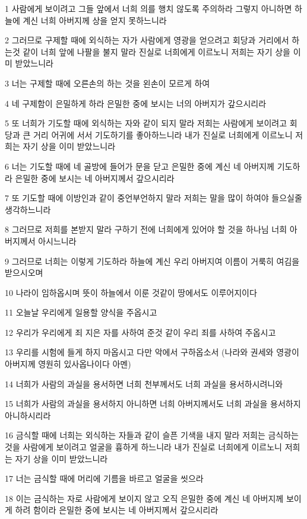 \par 1 사람에게 보이려고 그들 앞에서 너희 의를 행치 않도록 주의하라 그렇지 아니하면 하늘에 계신 너희 아버지께 상을 얻지 못하느니라
\par 2 그러므로 구제할 때에 외식하는 자가 사람에게 영광을 얻으려고 회당과 거리에서 하는것 같이 너희 앞에 나팔을 불지 말라 진실로 너희에게 이르노니 저희는 자기 상을 이미 받았느니라
\par 3 너는 구제할 때에 오른손의 하는 것을 왼손이 모르게 하여
\par 4 네 구제함이 은밀하게 하라 은밀한 중에 보시는 너의 아버지가 갚으시리라
\par 5 또 너희가 기도할 때에 외식하는 자와 같이 되지 말라 저희는 사람에게 보이려고 회당과 큰 거리 어귀에 서서 기도하기를 좋아하느니라 내가 진실로 너희에게 이르노니 저희는 자기 상을 이미 받았느니라
\par 6 너는 기도할 때에 네 골방에 들어가 문을 닫고 은밀한 중에 계신 네 아버지께 기도하라 은밀한 중에 보시는 네 아버지께서 갚으시리라
\par 7 또 기도할 때에 이방인과 같이 중언부언하지 말라 저희는 말을 많이 하여야 들으실줄 생각하느니라
\par 8 그러므로 저희를 본받지 말라 구하기 전에 너희에게 있어야 할 것을 하나님 너희 아버지께서 아시느니라
\par 9 그러므로 너희는 이렇게 기도하라 하늘에 계신 우리 아버지여 이름이 거룩히 여김을 받으시오며
\par 10 나라이 임하옵시며 뜻이 하늘에서 이룬 것같이 땅에서도 이루어지이다
\par 11 오늘날 우리에게 일용할 양식을 주옵시고
\par 12 우리가 우리에게 죄 지은 자를 사하여 준것 같이 우리 죄를 사하여 주옵시고
\par 13 우리를 시험에 들게 하지 마옵시고 다만 악에서 구하옵소서 (나라와 권세와 영광이 아버지께 영원히 있사옵나이다 아멘)
\par 14 너희가 사람의 과실을 용서하면 너희 천부께서도 너희 과실을 용서하시려니와
\par 15 너희가 사람의 과실을 용서하지 아니하면 너희 아버지께서도 너희 과실을 용서하지 아니하시리라
\par 16 금식할 때에 너희는 외식하는 자들과 같이 슬픈 기색을 내지 말라 저희는 금식하는 것을 사람에게 보이려고 얼굴을 흉하게 하느니라 내가 진실로 너희에게 이르노니 저희는 자기 상을 이미 받았느니라
\par 17 너는 금식할 때에 머리에 기름을 바르고 얼굴을 씻으라
\par 18 이는 금식하는 자로 사람에게 보이지 않고 오직 은밀한 중에 계신 네 아버지께 보이게 하려 함이라 은밀한 중에 보시는 네 아버지께서 갚으시리라
